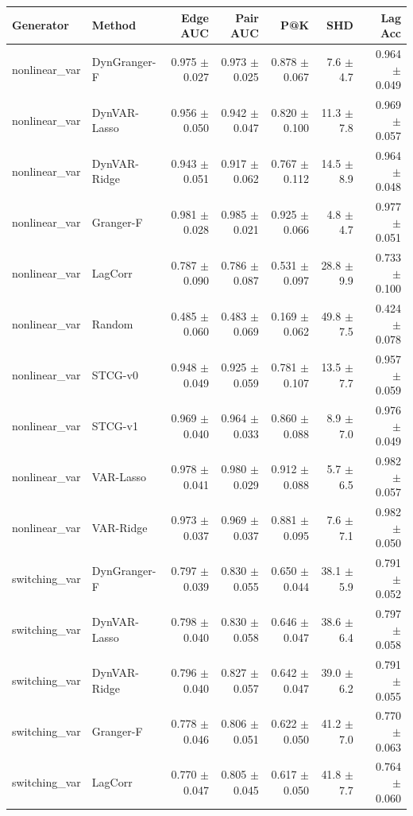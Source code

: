 \begin{tabular}{llrrrrr}
\toprule
Generator & Method & Edge AUC & Pair AUC & P@K & SHD & Lag Acc \\
\midrule
nonlinear_var & DynGranger-F & 0.975 $\pm$ 0.027 & 0.973 $\pm$ 0.025 & 0.878 $\pm$ 0.067 & 7.6 $\pm$ 4.7 & 0.964 $\pm$ 0.049 \\
nonlinear_var & DynVAR-Lasso & 0.956 $\pm$ 0.050 & 0.942 $\pm$ 0.047 & 0.820 $\pm$ 0.100 & 11.3 $\pm$ 7.8 & 0.969 $\pm$ 0.057 \\
nonlinear_var & DynVAR-Ridge & 0.943 $\pm$ 0.051 & 0.917 $\pm$ 0.062 & 0.767 $\pm$ 0.112 & 14.5 $\pm$ 8.9 & 0.964 $\pm$ 0.048 \\
nonlinear_var & Granger-F & 0.981 $\pm$ 0.028 & 0.985 $\pm$ 0.021 & 0.925 $\pm$ 0.066 & 4.8 $\pm$ 4.7 & 0.977 $\pm$ 0.051 \\
nonlinear_var & LagCorr & 0.787 $\pm$ 0.090 & 0.786 $\pm$ 0.087 & 0.531 $\pm$ 0.097 & 28.8 $\pm$ 9.9 & 0.733 $\pm$ 0.100 \\
nonlinear_var & Random & 0.485 $\pm$ 0.060 & 0.483 $\pm$ 0.069 & 0.169 $\pm$ 0.062 & 49.8 $\pm$ 7.5 & 0.424 $\pm$ 0.078 \\
nonlinear_var & STCG-v0 & 0.948 $\pm$ 0.049 & 0.925 $\pm$ 0.059 & 0.781 $\pm$ 0.107 & 13.5 $\pm$ 7.7 & 0.957 $\pm$ 0.059 \\
nonlinear_var & STCG-v1 & 0.969 $\pm$ 0.040 & 0.964 $\pm$ 0.033 & 0.860 $\pm$ 0.088 & 8.9 $\pm$ 7.0 & 0.976 $\pm$ 0.049 \\
nonlinear_var & VAR-Lasso & 0.978 $\pm$ 0.041 & 0.980 $\pm$ 0.029 & 0.912 $\pm$ 0.088 & 5.7 $\pm$ 6.5 & 0.982 $\pm$ 0.057 \\
nonlinear_var & VAR-Ridge & 0.973 $\pm$ 0.037 & 0.969 $\pm$ 0.037 & 0.881 $\pm$ 0.095 & 7.6 $\pm$ 7.1 & 0.982 $\pm$ 0.050 \\
switching_var & DynGranger-F & 0.797 $\pm$ 0.039 & 0.830 $\pm$ 0.055 & 0.650 $\pm$ 0.044 & 38.1 $\pm$ 5.9 & 0.791 $\pm$ 0.052 \\
switching_var & DynVAR-Lasso & 0.798 $\pm$ 0.040 & 0.830 $\pm$ 0.058 & 0.646 $\pm$ 0.047 & 38.6 $\pm$ 6.4 & 0.797 $\pm$ 0.058 \\
switching_var & DynVAR-Ridge & 0.796 $\pm$ 0.040 & 0.827 $\pm$ 0.057 & 0.642 $\pm$ 0.047 & 39.0 $\pm$ 6.2 & 0.791 $\pm$ 0.055 \\
switching_var & Granger-F & 0.778 $\pm$ 0.046 & 0.806 $\pm$ 0.051 & 0.622 $\pm$ 0.050 & 41.2 $\pm$ 7.0 & 0.770 $\pm$ 0.063 \\
switching_var & LagCorr & 0.770 $\pm$ 0.047 & 0.805 $\pm$ 0.045 & 0.617 $\pm$ 0.050 & 41.8 $\pm$ 7.7 & 0.764 $\pm$ 0.060 \\

\end{tabular}
